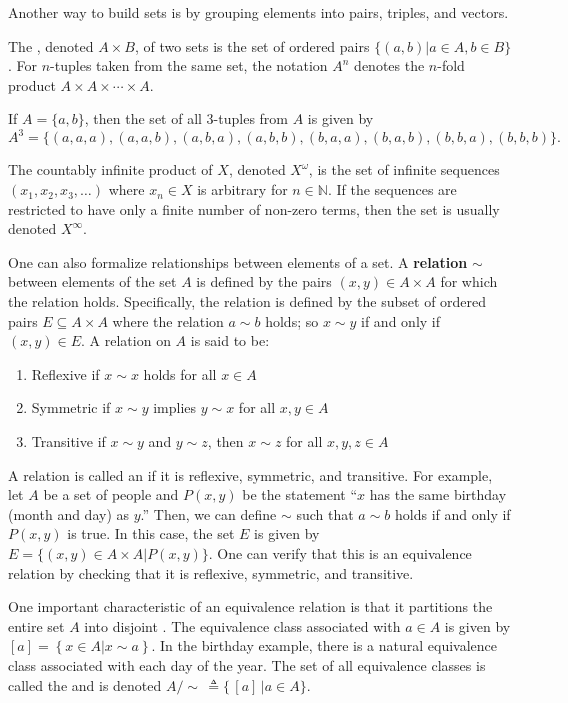 Another way to build sets is by grouping elements into pairs, triples, and vectors.
\begin{definition}
The , denoted $A\times B$, of two sets is the set of ordered pairs $\{(a,b) | a\in A, b\in B\}$.
For $n$-tuples taken from the same set, the notation $A^n$ denotes the $n$-fold product $A\times A \times \cdots \times A$.
\end{definition}
\begin{example}
If $A  = \{ a,b \}$, then the set of all 3-tuples from $A$ is given by 
\begin{equation*}
A^3 = \{ (a,a,a),(a,a,b),(a,b,a),(a,b,b),(b,a,a),(b,a,b),(b,b,a),(b,b,b) \}.
\end{equation*}
\end{example}
The countably infinite product of $X$, denoted $X^\omega$, is the set of infinite sequences $(x_1,x_2,x_3,\ldots)$ where $x_n \in X$ is arbitrary for $n\in \mathbb{N}$.
If the sequences are restricted to have only a finite number of non-zero terms, then the set is usually denoted $X^\infty$.

One can also formalize relationships between elements of a set.
A \textbf{relation} $\sim$ between elements of the set $A$ is defined by the pairs $(x,y)\in A\times A$ for which the relation holds.
Specifically, the relation is defined by the subset of ordered pairs $E\subseteq A\times A$ where the relation $a\sim b$ holds; so $x\sim y$ if and only if $(x,y)\in E$.
A relation on $A$ is said to be:
\begin{enumerate}
\item Reflexive if $x\sim x$ holds for all $x\in A$
\item Symmetric if $x\sim y$ implies $y\sim x$ for all $x,y\in A$
\item Transitive if $x\sim y$ and $y\sim z$, then $x\sim z$ for all $x,y,z\in A$
\end{enumerate}

A relation is called an  if it is reflexive, symmetric, and transitive.
For example, let $A$ be a set of people and $P(x,y)$ be the statement ``$x$ has the same birthday (month and day) as $y$.''
Then, we can define $\sim$ such that $a\sim b$ holds if and only if $P(x,y)$ is true.
In this case, the set $E$ is given by $E = \{ (x,y)\in A\times A | P(x,y) \}$.
One can verify that this is an equivalence relation by checking that it is reflexive, symmetric, and transitive.

One important characteristic of an equivalence relation is that it partitions the entire set $A$ into disjoint .
The equivalence class associated with $a\in A$ is given by  $[a] = \left\{x\in A | x \sim a\right\}$.
In the birthday example, there is a natural equivalence class associated with each day of the year.
The set of all equivalence classes is called the  and is denoted $A / \!\! \sim \, \triangleq \{ \,[a]\, | a\in A \}$.

